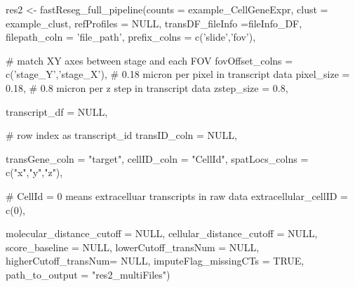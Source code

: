 \documentclass[letterpaper]{book}
\begin{document}
\begin{Examples}
\begin{ExampleCode}
res2 <- fastReseg_full_pipeline(counts = example_CellGeneExpr,
                                clust = example_clust,
                                refProfiles = NULL,
                                transDF_fileInfo =fileInfo_DF,
                                filepath_coln = 'file_path',
                                prefix_colns = c('slide','fov'),
                                
                                # match XY axes between stage and each FOV
                                fovOffset_colns = c('stage_Y','stage_X'), 
                                # 0.18 micron per pixel in transcript data
                                pixel_size = 0.18, 
                                # 0.8 micron per z step in transcript data
                                zstep_size = 0.8, 
                                
                                transcript_df = NULL,
                                
                                # row index as transcript_id
                                transID_coln = NULL, 
                                
                                transGene_coln = "target",
                                cellID_coln = "CellId",
                                spatLocs_colns = c("x","y","z"),
                                
                                # CellId = 0 means extracelluar transcripts in raw data
                                extracellular_cellID = c(0), 
                                
                                molecular_distance_cutoff = NULL,
                                cellular_distance_cutoff = NULL,
                                score_baseline = NULL,
                                lowerCutoff_transNum = NULL,
                                higherCutoff_transNum= NULL,
                                imputeFlag_missingCTs = TRUE,
                                path_to_output = "res2_multiFiles")


\end{ExampleCode}
\end{Examples}
\end{document}
